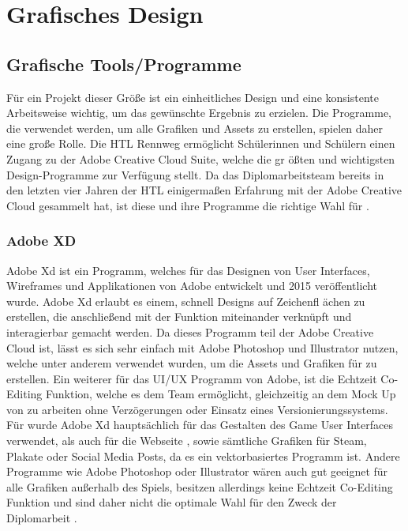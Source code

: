 
\chapter{Grafisches Design}\label{ch:grafikdesign}

\renewcommand{\kapitelautor}{Autor: Markus Böheim}

\section{Grafische Tools/Programme}

Für ein Projekt dieser Größe
ist ein einheitliches Design und eine konsistente Arbeitsweise wichtig, um das gewünschte Ergebnis zu erzielen.
Die Programme, die verwendet werden, um alle Grafiken und Assets zu erstellen, spielen daher eine große Rolle.
Die HTL Rennweg ermöglicht Schülerinnen und Schülern einen Zugang zu der Adobe Creative Cloud Suite, welche die gr
ößten und wichtigsten Design-Programme zur Verfügung stellt. Da das Diplomarbeitsteam bereits in den letzten vier Jahren der HTL einigermaßen Erfahrung mit der Adobe Creative Cloud gesammelt hat, ist diese und ihre Programme die richtige Wahl für \FF.

\subsection{Adobe XD}

Adobe Xd ist ein Programm, welches für das Designen von User Interfaces, Wireframes und Applikationen von Adobe
entwickelt und 2015 veröffentlicht wurde.  Adobe Xd erlaubt es einem, schnell Designs auf Zeichenfl
ächen zu
erstellen,
die anschließend mit der  Funktion miteinander verknüpft und interagierbar gemacht werden.
Da dieses Programm teil der Adobe Creative Cloud ist, lässt es sich sehr einfach mit Adobe Photoshop und Illustrator nutzen, welche unter anderem verwendet wurden, um die Assets und Grafiken für \FF zu erstellen. Ein weiterer
für das UI/UX Programm von Adobe, ist die Echtzeit Co-Editing Funktion, welche es dem Team ermöglicht, gleichzeitig an dem Mock Up von \FF zu arbeiten ohne Verzögerungen oder Einsatz eines Versionierungssystems.
Für \FF wurde Adobe Xd hauptsächlich für das Gestalten des Game User Interfaces verwendet, als auch für die Webseite
, sowie sämtliche Grafiken für Steam, Plakate oder Social Media Posts, da es ein vektorbasiertes Programm ist. Andere
Programme wie Adobe Photoshop oder Illustrator wären auch gut geeignet für alle Grafiken außerhalb des Spiels,
besitzen allerdings keine Echtzeit Co-Editing Funktion und sind daher nicht die optimale Wahl für den Zweck der
Diplomarbeit .

